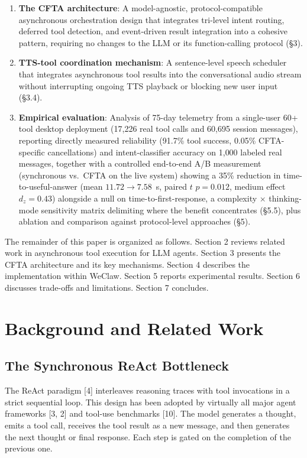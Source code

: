 \documentclass[numbered,mediumone,traditional]{oup-authoring-template}
\begin{document}
\begin{enumerate}
  \item \textbf{The CFTA architecture}: A model-agnostic, protocol-compatible asynchronous orchestration design that integrates tri-level intent routing, deferred tool detection, and event-driven result integration into a cohesive pattern, requiring no changes to the LLM or its function-calling protocol (\S3).
  \item \textbf{TTS-tool coordination mechanism}: A sentence-level speech scheduler that integrates asynchronous tool results into the conversational audio stream without interrupting ongoing TTS playback or blocking new user input (\S3.4).
  \item \textbf{Empirical evaluation}: Analysis of 75-day telemetry from a single-user 60+ tool desktop deployment (17,226 real tool calls and 60,695 session messages), reporting directly measured reliability (91.7\% tool success, 0.05\% CFTA-specific cancellations) and intent-classifier accuracy on 1{,}000 labeled real messages, together with a controlled end-to-end A/B measurement (synchronous vs.\ CFTA on the live system) showing a 35\% reduction in time-to-useful-answer (mean $11.72 \to 7.58$~s, paired $t$ $p = 0.012$, medium effect $d_z = 0.43$) alongside a null on time-to-first-response, a complexity $\times$ thinking-mode sensitivity matrix delimiting where the benefit concentrates (\S5.5), plus ablation and comparison against protocol-level approaches (\S5).
\end{enumerate}

The remainder of this paper is organized as follows. Section 2 reviews related work in asynchronous tool execution for LLM agents. Section 3 presents the CFTA architecture and its key mechanisms. Section 4 describes the implementation within WeClaw. Section 5 reports experimental results. Section 6 discusses trade-offs and limitations. Section 7 concludes.

\section{Background and Related Work}

\subsection{The Synchronous ReAct Bottleneck}

The ReAct paradigm [4] interleaves reasoning traces with tool invocations in a strict sequential loop. This design has been adopted by virtually all major agent frameworks [3, 2] and tool-use benchmarks [10]. The model generates a thought, emits a tool call, receives the tool result as a new message, and then generates the next thought or final response. Each step is gated on the completion of the previous one.
\end{document}
